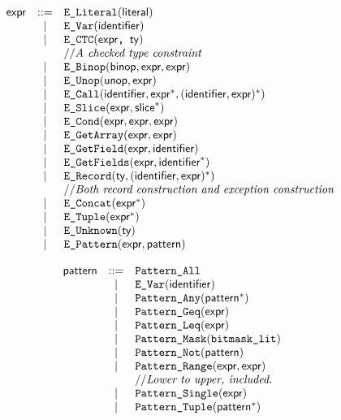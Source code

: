 \documentclass{book}
\begin{document}
\[
\begin{array}{rcl}
\textsf{expr} &::=& \texttt{E\_Literal}(\textsf{literal}) \\
	&|& \texttt{E\_Var}(\texttt{\textsf{identifier}}) \\
	&|& \texttt{E\_CTC}(\texttt{\textsf{expr}, \textsf{ty}}) \\
    & & // \textit{A checked type constraint}\ \\
	&|& \texttt{E\_Binop}(\textsf{binop}, \textsf{expr}, \textsf{expr}) \\
	&|& \texttt{E\_Unop}(\textsf{unop}, \textsf{expr}) \\
	&|& \texttt{E\_Call}(\textsf{identifier}, \textsf{expr}^{*}, (\textsf{identifier}, \textsf{expr})^{*}) \\
	&|& \texttt{E\_Slice}(\textsf{expr}, \textsf{slice}^{*}) \\
	&|& \texttt{E\_Cond}(\textsf{expr}, \textsf{expr}, \textsf{expr}) \\
	&|& \texttt{E\_GetArray}(\textsf{expr}, \textsf{expr}) \\
	&|& \texttt{E\_GetField}(\textsf{expr}, \textsf{identifier}) \\
	&|& \texttt{E\_GetFields}(\textsf{expr}, \textsf{identifier}^{*}) \\
	&|& \texttt{E\_Record}(\textsf{ty}, (\textsf{identifier}, \textsf{expr})^{*})\\
    & & // \textit{Both record construction and exception construction}\ \\
	&|& \texttt{E\_Concat}(\textsf{expr}^{*}) \\
	&|& \texttt{E\_Tuple}(\textsf{expr}^{*}) \\
	&|& \texttt{E\_Unknown}(\textsf{ty}) \\
	&|& \texttt{E\_Pattern}(\textsf{expr}, \textsf{pattern})
\end{array}
\]

\[
\begin{array}{rcl}
\textsf{pattern} &::=& \texttt{Pattern\_All} \\
	&|& \texttt{E\_Var}(\texttt{\textsf{identifier}}) \\
  &|& \texttt{Pattern\_Any}(\textsf{pattern}^{*}) \\
  &|& \texttt{Pattern\_Geq}(\textsf{expr}) \\
  &|& \texttt{Pattern\_Leq}(\textsf{expr}) \\
  &|& \texttt{Pattern\_Mask}(\texttt{bitmask\_lit}) \\
  &|& \texttt{Pattern\_Not}(\textsf{pattern}) \\
  &|& \texttt{Pattern\_Range}(\textsf{expr}, \textsf{expr})\\
  & & // \textit{Lower to upper, included.}\ \\
  &|& \texttt{Pattern\_Single}(\textsf{expr}) \\
  &|& \texttt{Pattern\_Tuple}(\textsf{pattern}^{*}) \\
\end{array}
\]
\end{document}
